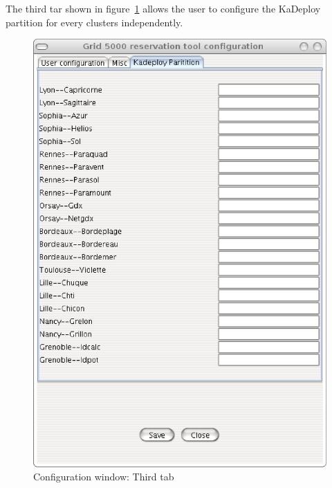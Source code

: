 The third tar shown in figure~\ref{fig:cfg_tab3} allows the user to configure
the KaDeploy partition for every clusters independently.

\begin{figure}[H]
\centering
\includegraphics[width=0.4\linewidth]{figures/GRUDU_conf3.eps}
\caption{Configuration window: Third tab}
\label{fig:cfg_tab3}
\end{figure}

